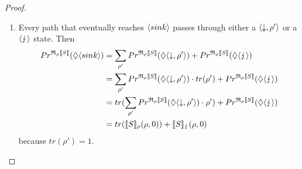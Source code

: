 \documentclass[a4paper,UKenglish,cleveref, autoref, thm-restate]{lipics-v2021}
\begin{document}
\begin{proof}
\begin{enumerate}
\begin{itemize}
\begin{enumerate}
         Now we have to show the other direction, i.e., the left side is an upper bound for the right side ($\geq$):
         Every path starting in $\config{\while'}{\rho}$ that reaches $\errConfig$ at some point has to reach $\errConfig$ after a finite number $m$ of loop iterations. That means, for each path there exists a $m$ such that the path is also included in the set of paths starting in $\config{(\while')^m}{\rho}$. Taking the maximum $m'$ of all these $m$, gives a Markov chain with initial state $\config{(\while')^{m'}}{\rho}$ that includes all paths of $\eventually \errConfig$ starting in $\config{\while'}{\rho}$ with the same probability.
         This implies that also the least upper bound of all values $n$ (which includes $m'$) is greater or equal to the right side, which concludes the proof that they are equal.
        \end{enumerate}
    \end{itemize}
    \item Every path that eventually reaches $\langle sink \rangle$ passes through either a $\langle \downarrow , \rho' \rangle$ or a $\errConfig$ state.
    Then
    \begin{align*}
        Pr^{\mathfrak{R}_{\rho}\llbracket S \rrbracket}(\lozenge \langle sink \rangle) &= \sum_{\rho'} Pr^{\mathfrak{R}_{\rho}\llbracket S \rrbracket}(\lozenge \langle \downarrow , \rho' \rangle) + Pr^{\mathfrak{R}_{\rho}\llbracket S \rrbracket}(\lozenge \langle \lightning \rangle) \\
        &= \sum_{\rho'} Pr^{\mathfrak{R}_{\rho}\llbracket S \rrbracket}(\lozenge \langle \downarrow , \rho' \rangle) \cdot tr(\rho')+ Pr^{\mathfrak{R}_{\rho}\llbracket S \rrbracket}(\lozenge \langle \lightning \rangle) \\
        &= tr(\sum_{\rho'} Pr^{\mathfrak{R}_{\rho}\llbracket S \rrbracket}(\lozenge \langle \downarrow , \rho' \rangle) \cdot \rho') + Pr^{\mathfrak{R}_{\rho}\llbracket S \rrbracket}(\lozenge \langle \lightning \rangle) \\
        &= tr(\llbracket S \rrbracket_{\rho}(\rho,0))+\llbracket S \rrbracket_{\lightning}(\rho,0)
    \end{align*}
    because $tr(\rho')=1$.
\end{enumerate}

\end{proof}
\end{document}
